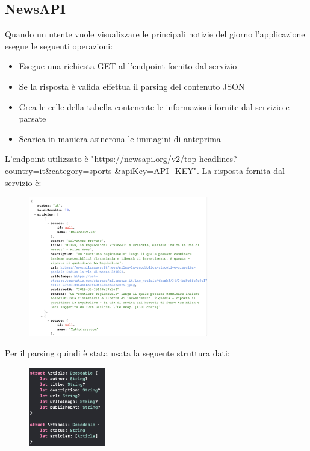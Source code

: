 \documentclass[numbers=noenddot, 12pt, a4paper, oneside]{scrbook}
\begin{document}
\subsection*{NewsAPI}
Quando un utente vuole visualizzare le principali notizie del giorno l'applicazione esegue le seguenti operazioni:
\begin{itemize}
	\item Esegue una richiesta GET al l'endpoint fornito dal servizio
	\item Se la risposta è valida effettua il parsing del contenuto JSON
	\item Crea le celle della tabella contenente le informazioni fornite dal servizio e parsate
	\item Scarica in maniera asincrona le immagini di anteprima
\end{itemize}
L'endpoint utilizzato è "https://newsapi.org/v2/top-headlines?country=it\&category=sports \&apiKey=API\_KEY". La risposta fornita dal servizio è:
\begin{figure}[H]
	\centering
	\includegraphics[width=0.7\textwidth]{images/ResponseNewsAPI}
\end{figure}
Per il parsing quindi è stata usata la seguente struttura dati:
\begin{figure}[H]
	\centering
	\includegraphics[width=0.3\textwidth]{images/StructDati}
\end{figure}
\end{document}
